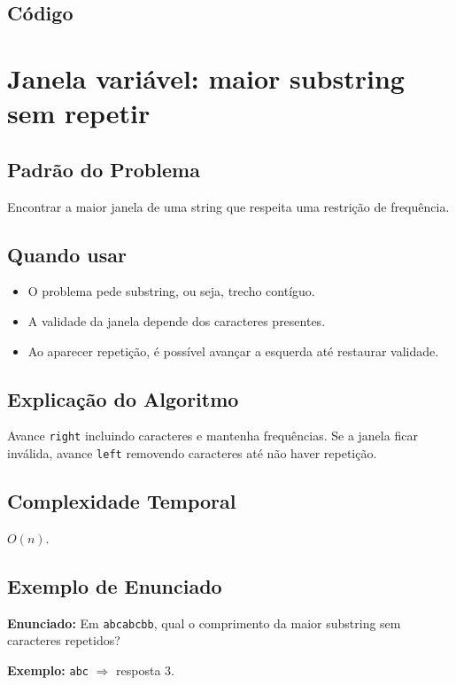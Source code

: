 \subsection{Código}

\section{Janela variável: maior substring sem repetir}

\subsection{Padrão do Problema}
Encontrar a maior janela de uma string que respeita uma restrição de frequência.

\subsection{Quando usar}
\begin{itemize}[nosep]
  \item O problema pede substring, ou seja, trecho contíguo.
  \item A validade da janela depende dos caracteres presentes.
  \item Ao aparecer repetição, é possível avançar a esquerda até restaurar validade.
\end{itemize}

\subsection{Explicação do Algoritmo}
Avance \texttt{right} incluindo caracteres e mantenha frequências. Se a janela ficar inválida, avance \texttt{left} removendo caracteres até não haver repetição.

\subsection{Complexidade Temporal}
$O(n)$.

\subsection{Exemplo de Enunciado}
\begin{exemplodiabox}
\textbf{Enunciado:} Em \texttt{abcabcbb}, qual o comprimento da maior substring sem caracteres repetidos?

\textbf{Exemplo:} \texttt{abc} $\Rightarrow$ resposta $3$.
\end{exemplodiabox}

